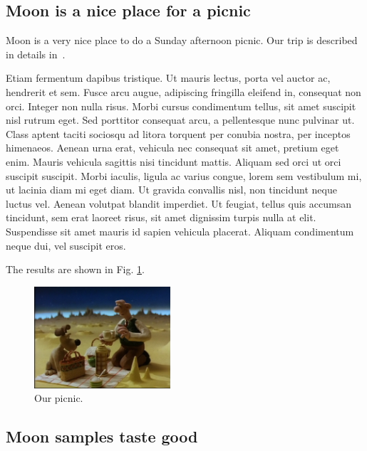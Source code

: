 \documentclass[final,12pt]{article}
\begin{document}
\subsection{Moon is a nice place for a picnic}

Moon is a very nice place to do a Sunday afternoon picnic. Our trip
is described in details in~\cite{trip}.

Etiam fermentum dapibus tristique. Ut mauris lectus, porta vel auctor
ac, hendrerit et sem. Fusce arcu augue, adipiscing fringilla eleifend
in, consequat non orci. Integer non nulla risus. Morbi cursus
condimentum tellus, sit amet suscipit nisl rutrum eget. Sed porttitor
consequat arcu, a pellentesque nunc pulvinar ut. Class aptent taciti
sociosqu ad litora torquent per conubia nostra, per inceptos
himenaeos. Aenean urna erat, vehicula nec consequat sit amet, pretium
eget enim. Mauris vehicula sagittis nisi tincidunt mattis. Aliquam sed
orci ut orci suscipit suscipit. Morbi iaculis, ligula ac varius
congue, lorem sem vestibulum mi, ut lacinia diam mi eget diam. Ut
gravida convallis nisl, non tincidunt neque luctus vel. Aenean
volutpat blandit imperdiet. Ut feugiat, tellus quis accumsan
tincidunt, sem erat laoreet risus, sit amet dignissim turpis nulla at
elit. Suspendisse sit amet mauris id sapien vehicula placerat. Aliquam
condimentum neque dui, vel suscipit eros.

The results are shown in Fig. \ref{fig:picnic}.

\begin{figure}[h]
\begin{center}
\includegraphics[width=0.45\textwidth]{figures/A_Grand_Day_Out.png}
\caption{Our picnic.}\label{fig:picnic}       %
\end{center}
\end{figure}


\subsection{Moon samples taste good}
\end{document}
